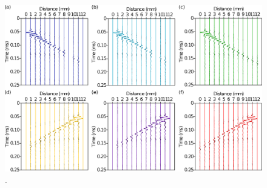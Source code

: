 \documentclass[manuscript,revised]{geophysics}
\begin{document}
\begin{figure}[!h]
	\centering
	\includegraphics[scale=0.4,angle=90]{fig/panel_lswe_once_comp.eps}
	\caption{.}
	\label{panel_srcest_2d_comp}
\end{figure}
\end{document}
